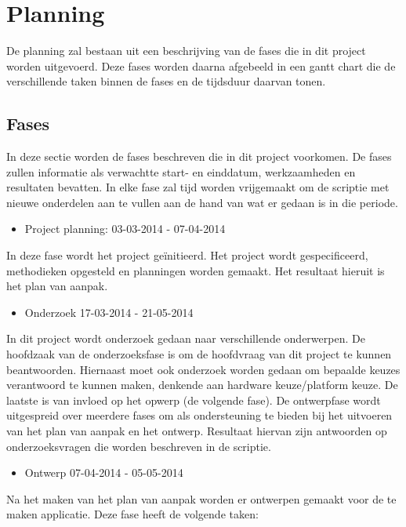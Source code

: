 \section{Planning}
De planning zal bestaan uit een beschrijving van de fases die in dit project worden uitgevoerd. Deze fases worden daarna afgebeeld in een gantt chart die de verschillende taken binnen de fases en de tijdsduur daarvan tonen.

\subsection{Fases}
In deze sectie worden de fases beschreven die in dit project voorkomen. De fases zullen informatie als verwachtte start- en einddatum, werkzaamheden en resultaten bevatten. In elke fase zal tijd worden vrijgemaakt om de scriptie met nieuwe onderdelen aan te vullen aan de hand van wat er gedaan is in die periode.

\begin{itemize}
\item Project planning: 03-03-2014 - 07-04-2014
\end{itemize}
In deze fase wordt het project geïnitieerd. Het project wordt gespecificeerd, methodieken opgesteld en planningen worden gemaakt. Het resultaat hieruit is het plan van aanpak.

\begin{itemize}
\item Onderzoek 17-03-2014 - 21-05-2014
\end{itemize}
In dit project wordt onderzoek gedaan naar verschillende onderwerpen. De hoofdzaak van de onderzoeksfase is om de hoofdvraag van dit project te kunnen beantwoorden. Hiernaast moet ook onderzoek worden gedaan om bepaalde keuzes verantwoord te kunnen maken, denkende aan hardware keuze/platform keuze. De laatste is van invloed op het opwerp (de volgende fase). De ontwerpfase wordt uitgespreid over meerdere fases om als ondersteuning te bieden bij het uitvoeren van het plan van aanpak en het ontwerp. Resultaat hiervan zijn antwoorden op onderzoeksvragen die worden beschreven in de scriptie.

\begin{itemize}
\item Ontwerp 07-04-2014 - 05-05-2014
\end{itemize}
Na het maken van het plan van aanpak worden er ontwerpen gemaakt voor de te maken applicatie. Deze fase heeft de volgende taken:

